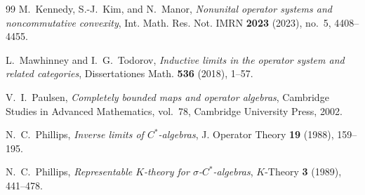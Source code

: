 \documentclass[11pt,a4paper]{amsart}
\theoremstyle{plain}
\theoremstyle{definition}
\begin{document}
\begin{thebibliography}{99}
M.~Kennedy, S.-J.~Kim, and N.~Manor,
\emph{Nonunital operator systems and noncommutative convexity},
Int. Math. Res. Not. IMRN \textbf{2023} (2023), no.~5, 4408--4455.

L.~Mawhinney and I.~G.~Todorov,
\emph{Inductive limits in the operator system and related categories},
Dissertationes Math. \textbf{536} (2018), 1--57.

V.~I.~Paulsen,
\emph{Completely bounded maps and operator algebras},
Cambridge Studies in Advanced Mathematics, vol.~78, Cambridge University Press, 2002.

N.~C.~Phillips,
\emph{Inverse limits of $C^*$-algebras},
J. Operator Theory \textbf{19} (1988), 159--195.

N.~C.~Phillips,
\emph{Representable $K$-theory for $\sigma$-$C^*$-algebras},
$K$-Theory \textbf{3} (1989), 441--478.

\end{thebibliography}
\end{document}
